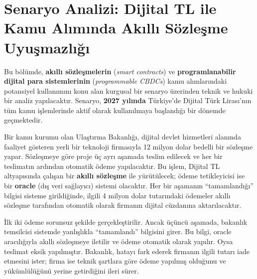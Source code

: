 \documentclass[a4paper,12pt]{article}
\begin{document}
\section{Senaryo Analizi: Dijital TL ile Kamu Alımında Akıllı Sözleşme Uyuşmazlığı}

Bu bölümde, \textbf{akıllı sözleşmelerin} (\textit{smart contracts}) ve \textbf{programlanabilir dijital para sistemlerinin} (\textit{programmable CBDCs}) kamu alımlarındaki potansiyel kullanımını konu alan kurgusal bir senaryo üzerinden teknik ve hukuki bir analiz yapılacaktır. Senaryo, \textbf{2027 yılında} Türkiye’de Dijital Türk Lirası’nın tüm kamu işlemlerinde aktif olarak kullanılmaya başlandığı bir dönemde geçmektedir.

Bir kamu kurumu olan Ulaştırma Bakanlığı, dijital devlet hizmetleri alanında faaliyet gösteren yerli bir teknoloji firmasıyla 12 milyon dolar bedelli bir sözleşme yapar. Sözleşmeye göre proje üç ayrı aşamada teslim edilecek ve her bir teslimatın ardından otomatik ödeme yapılacaktır. Bu işlem, Dijital TL altyapısında çalışan bir \textbf{akıllı sözleşme} ile yürütülecek; ödeme tetikleyicisi ise bir \textbf{oracle} (dış veri sağlayıcı) sistemi olacaktır. Her bir aşamanın “tamamlandığı” bilgisi sisteme girildiğinde, ilgili 4 milyon dolar tutarındaki ödemeler akıllı sözleşme tarafından otomatik olarak firmanın dijital cüzdanına aktarılacaktır.

İlk iki ödeme sorunsuz şekilde gerçekleştirilir. Ancak üçüncü aşamada, bakanlık temsilcisi sistemde yanlışlıkla “tamamlandı” bilgisini girer. Bu bilgi, oracle aracılığıyla akıllı sözleşmeye iletilir ve ödeme otomatik olarak yapılır. Oysa teslimat eksik yapılmıştır. Bakanlık, hatayı fark ederek firmanın ilgili tutarı iade etmesini ister; firma ise teknik şartlara göre ödeme yapılmış olduğunu ve yükümlülüğünü yerine getirdiğini ileri sürer.
\end{document}
